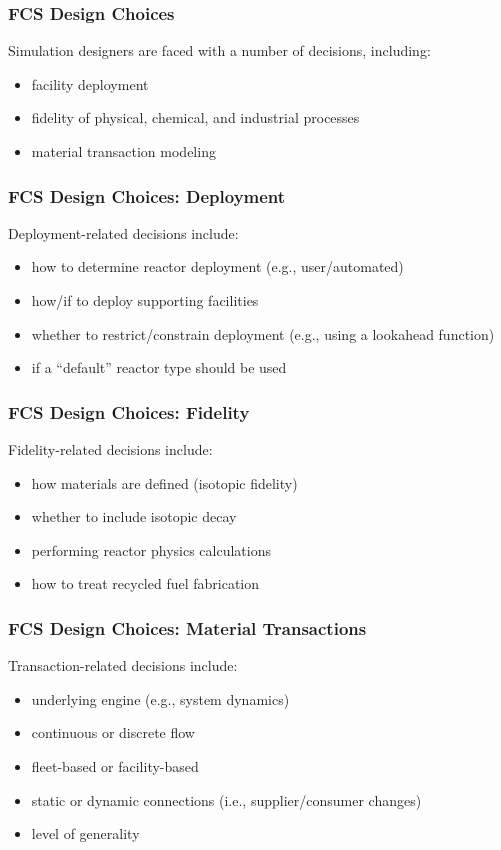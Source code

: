 \begin{frame}[ctb!]
  \frametitle{FCS Design Choices}
  Simulation designers are faced with a number of decisions, including:
  \begin{itemize}
    \item facility deployment
    \item fidelity of physical, chemical, and industrial processes
    \item material transaction modeling
  \end{itemize}
\end{frame}

\begin{frame}[ctb!]
  \frametitle{FCS Design Choices: Deployment}

  Deployment-related decisions include:
  \begin{itemize}
    \item how to determine reactor deployment (e.g., user/automated)
    \item how/if to deploy supporting facilities
    \item whether to restrict/constrain deployment (e.g., using a lookahead function)
    \item if a ``default'' reactor type should be used
  \end{itemize}

\end{frame}

\begin{frame}[ctb!]
  \frametitle{FCS Design Choices: Fidelity}

  Fidelity-related decisions include:
  \begin{itemize}
    \item how materials are defined (isotopic fidelity)
    \item whether to include isotopic decay
    \item performing reactor physics calculations
    \item how to treat recycled fuel fabrication
  \end{itemize}

\end{frame}

\begin{frame}[ctb!]
  \frametitle{FCS Design Choices: Material Transactions}

  Transaction-related decisions include:
  \begin{itemize}
    \item underlying engine (e.g., system dynamics)
    \item continuous or discrete flow
    \item fleet-based or facility-based
    \item static or dynamic connections (i.e., supplier/consumer changes)
    \item level of generality
  \end{itemize}

\end{frame}

